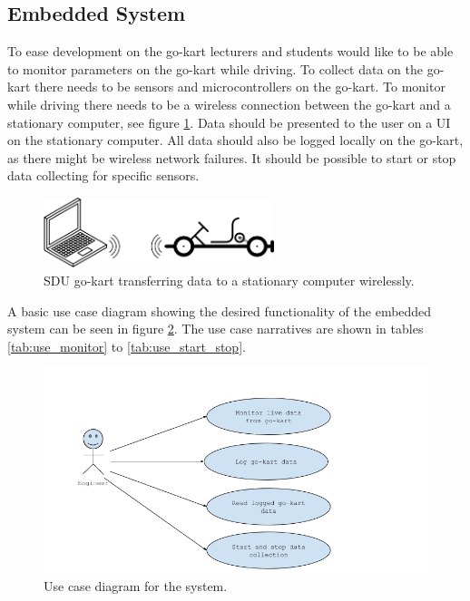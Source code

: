 \subsection{Embedded System}
To ease development on the go-kart lecturers and students would like to be able to monitor parameters on the go-kart while driving.
To collect data on the go-kart there needs to be sensors and microcontrollers on the go-kart.
To monitor while driving there needs to be a wireless connection between the go-kart and a stationary computer, see figure \ref{fig:simple}.
Data should be presented to the user on a UI on the stationary computer.
All data should also be logged locally on the go-kart, as there might be wireless network failures. 
It should be possible to start or stop data collecting for specific sensors.
\begin{figure}[h]
 	\centering
    \includegraphics[width=0.6\textwidth]{graphics/go_kart_network_simple}
    \caption{SDU go-kart transferring data to a stationary computer wirelessly.}
    \label{fig:simple}
\end{figure}

A basic use case diagram showing the desired functionality of the embedded system can be seen in figure \ref{fig:use_cases}.
The use case narratives are shown in tables \ref{tab:use_monitor} to \ref{tab:use_start_stop}.


\begin{figure}[h]
 	\centering
    \includegraphics[width=1\textwidth]{graphics/use_cases.png}
    \caption{Use case diagram for the system.}
    \label{fig:use_cases}
\end{figure}

